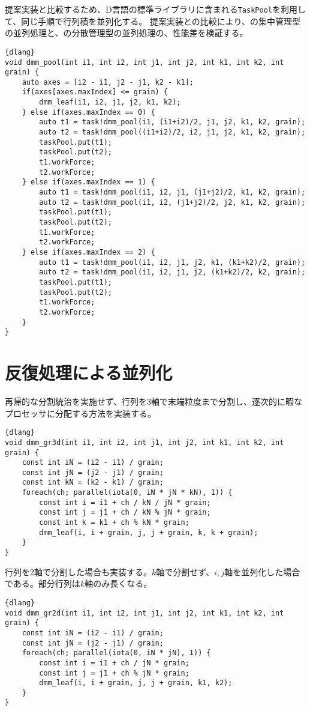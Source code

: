 \documentclass[10pt,a4paper]{book}
\begin{document}
提案実装と比較するため、D言語の標準ライブラリに含まれる\texttt{TaskPool}を利用して、同じ手順で行列積を並列化する。
提案実装との比較により、の集中管理型の並列処理と、の分散管理型の並列処理の、性能差を検証する。

\begin{Verbatim}{dlang}
void dmm_pool(int i1, int i2, int j1, int j2, int k1, int k2, int grain) {
	auto axes = [i2 - i1, j2 - j1, k2 - k1];
	if(axes[axes.maxIndex] <= grain) {
		dmm_leaf(i1, i2, j1, j2, k1, k2);
	} else if(axes.maxIndex == 0) {
		auto t1 = task!dmm_pool(i1, (i1+i2)/2, j1, j2, k1, k2, grain);
		auto t2 = task!dmm_pool((i1+i2)/2, i2, j1, j2, k1, k2, grain);
		taskPool.put(t1);
		taskPool.put(t2);
		t1.workForce;
		t2.workForce;
	} else if(axes.maxIndex == 1) {
		auto t1 = task!dmm_pool(i1, i2, j1, (j1+j2)/2, k1, k2, grain);
		auto t2 = task!dmm_pool(i1, i2, (j1+j2)/2, j2, k1, k2, grain);
		taskPool.put(t1);
		taskPool.put(t2);
		t1.workForce;
		t2.workForce;
	} else if(axes.maxIndex == 2) {
		auto t1 = task!dmm_pool(i1, i2, j1, j2, k1, (k1+k2)/2, grain);
		auto t2 = task!dmm_pool(i1, i2, j1, j2, (k1+k2)/2, k2, grain);
		taskPool.put(t1);
		taskPool.put(t2);
		t1.workForce;
		t2.workForce;
	}
}
\end{Verbatim}

\section{反復処理による並列化\label{sect:dmm:grid}}

再帰的な分割統治を実施せず、行列を3軸で末端粒度まで分割し、逐次的に暇なプロセッサに分配する方法を実装する。

\begin{Verbatim}{dlang}
void dmm_gr3d(int i1, int i2, int j1, int j2, int k1, int k2, int grain) {
	const int iN = (i2 - i1) / grain;
	const int jN = (j2 - j1) / grain;
	const int kN = (k2 - k1) / grain;
	foreach(ch; parallel(iota(0, iN * jN * kN), 1)) {
		const int i = i1 + ch / kN / jN * grain;
		const int j = j1 + ch / kN % jN * grain;
		const int k = k1 + ch % kN * grain;
		dmm_leaf(i, i + grain, j, j + grain, k, k + grain);
	}
}
\end{Verbatim}

行列を2軸で分割した場合も実装する。$k$軸で分割せず、$i,j$軸を並列化した場合である。部分行列は$k$軸のみ長くなる。

\begin{Verbatim}{dlang}
void dmm_gr2d(int i1, int i2, int j1, int j2, int k1, int k2, int grain) {
	const int iN = (i2 - i1) / grain;
	const int jN = (j2 - j1) / grain;
	foreach(ch; parallel(iota(0, iN * jN), 1)) {
		const int i = i1 + ch / jN * grain;
		const int j = j1 + ch % jN * grain;
		dmm_leaf(i, i + grain, j, j + grain, k1, k2);
	}
}
\end{Verbatim}
\end{document}
